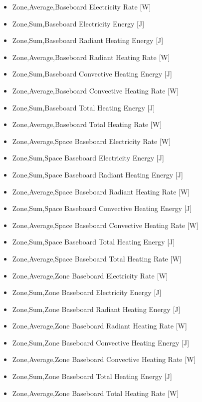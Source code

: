 \begin{itemize}
\tightlist
\item
  Zone,Average,Baseboard Electricity Rate {[}W{]}
\item
  Zone,Sum,Baseboard Electricity Energy {[}J{]}
\item
  Zone,Sum,Baseboard Radiant Heating Energy {[}J{]}
\item
  Zone,Average,Baseboard Radiant Heating Rate {[}W{]}
\item
  Zone,Sum,Baseboard Convective Heating Energy {[}J{]}
\item
  Zone,Average,Baseboard Convective Heating Rate {[}W{]}
\item
  Zone,Sum,Baseboard Total Heating Energy {[}J{]}
\item
  Zone,Average,Baseboard Total Heating Rate {[}W{]}
\item
  Zone,Average,Space Baseboard Electricity Rate {[}W{]}
\item
  Zone,Sum,Space Baseboard Electricity Energy {[}J{]}
\item
  Zone,Sum,Space Baseboard Radiant Heating Energy {[}J{]}
\item
  Zone,Average,Space Baseboard Radiant Heating Rate {[}W{]}
\item
  Zone,Sum,Space Baseboard Convective Heating Energy {[}J{]}
\item
  Zone,Average,Space Baseboard Convective Heating Rate {[}W{]}
\item
  Zone,Sum,Space Baseboard Total Heating Energy {[}J{]}
\item
  Zone,Average,Space Baseboard Total Heating Rate {[}W{]}
\item
  Zone,Average,Zone Baseboard Electricity Rate {[}W{]}
\item
  Zone,Sum,Zone Baseboard Electricity Energy {[}J{]}
\item
  Zone,Sum,Zone Baseboard Radiant Heating Energy {[}J{]}
\item
  Zone,Average,Zone Baseboard Radiant Heating Rate {[}W{]}
\item
  Zone,Sum,Zone Baseboard Convective Heating Energy {[}J{]}
\item
  Zone,Average,Zone Baseboard Convective Heating Rate {[}W{]}
\item
  Zone,Sum,Zone Baseboard Total Heating Energy {[}J{]}
\item
  Zone,Average,Zone Baseboard Total Heating Rate {[}W{]}
\end{itemize}

